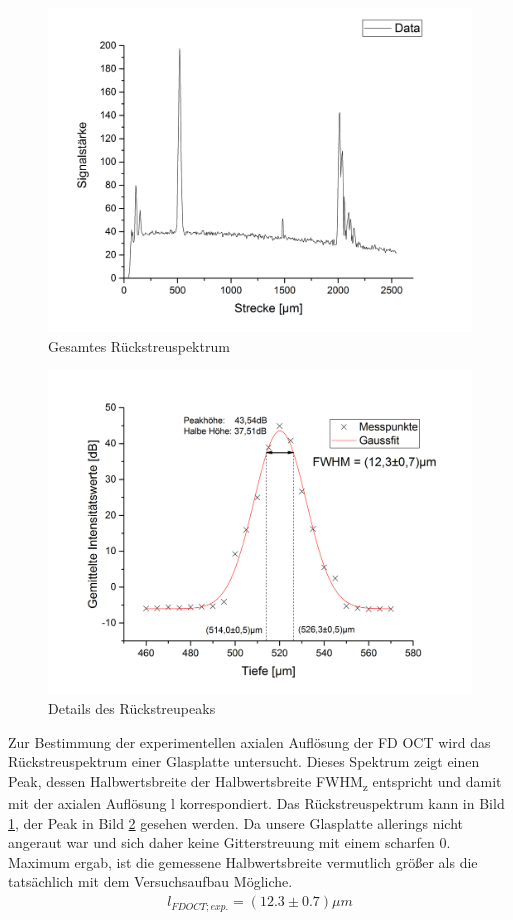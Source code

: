 \documentclass[german, %
parskip=full, %
bibliography=totoc, %
]{scrartcl}
\begin{document}
\begin{figure}[ht]
	\centering
	  \includegraphics[width=\textwidth]{Glasplattenreflex}
  \caption{Gesamtes Rückstreuspektrum}
	\label{fig:Spektrum}
\end{figure}
\begin{figure}[ht]
  \centering
	  \includegraphics[width=\textwidth]{Glasplatte_final}
	\caption{Details des Rückstreupeaks}
	\label{fig:peak}
\end{figure}

Zur Bestimmung der experimentellen axialen Auflösung der FD OCT wird das Rückstreuspektrum einer Glasplatte untersucht. Dieses Spektrum zeigt einen Peak, dessen Halbwertsbreite der Halbwertsbreite FWHM\textsubscript{z} entspricht und damit mit der axialen Auflösung l korrespondiert. Das Rückstreuspektrum kann in Bild \ref{fig:Spektrum}, der Peak in Bild \ref{fig:peak} gesehen werden. Da unsere Glasplatte allerings nicht angeraut war und sich daher keine Gitterstreuung mit einem scharfen 0. Maximum ergab, ist die gemessene Halbwertsbreite vermutlich größer als die tatsächlich mit dem Versuchsaufbau Mögliche.
\begin{align*}
l_{FD OCT; exp.} = (12.3 \pm 0.7) \mu m
\end{align*}
\end{document}
